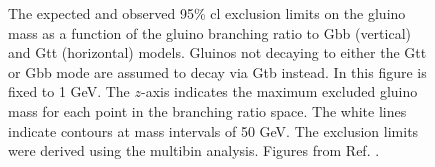 \begin{figure}[htbp]
  \centering 
  \caption{The   expected and  observed 95\% \gls{cl} exclusion limits on the gluino mass as a function of the gluino branching ratio to Gbb (vertical) and Gtt (horizontal) models. Gluinos not decaying to either the Gtt or Gbb mode are assumed to decay via Gtb instead. In this figure \mchi is fixed to 1 GeV. The $z$-axis indicates the maximum excluded gluino mass for each point in the branching ratio space. The white lines indicate contours at mass intervals of 50 GeV. The exclusion limits were derived using the multibin analysis.
  Figures from Ref. \cite{ATLAS-CONF-2018-041}.}
  \label{fig:limits_triangle_1}
\end{figure}

